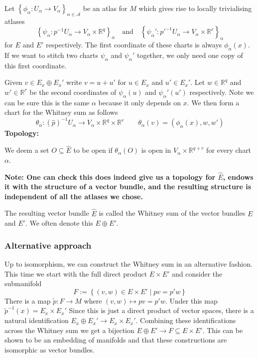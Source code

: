 \documentclass[11pt]{article}
\newcommand{\defeq}{:=}
\newcommand{\relmiddle}[1]{\mathrel{}\middle#1\mathrel{}}
\newcommand{\rmv}{\relmiddle|}
\newcommand{\R}{\mathbb{R}}
\newenvironment{defin}
	{\begin{mdframed}[backgroundcolor=white, roundcorner=5pt, linewidth=1pt, linecolor=RoyalBlue]
		\setlength{\parindent}{0pt}}
	{\end{mdframed}}
\newcommand{\mdf}[1]{{\color{RoyalBlue} #1}}
\newenvironment{note}
	{\begin{mdframed}[backgroundcolor=white, linecolor=RubineRed, roundcorner=5pt, linewidth=1pt]\bfseries{Note:}\normalfont
	\setlength{\parindent}{0pt}}
	{\end{mdframed}}
\begin{document}
Let $\left\{ \phi_\alpha: U_\alpha \to V_\alpha\right\}_{\alpha\in\mathcal{A}}$ be an atlas for $M$ which gives rise to locally trivialising atlases\[
	\left\{ \psi_\alpha : p^{-1}U_\alpha \to V_\alpha \times \R^q\right\}_\alpha \quad \text{and} \quad \left\{ \psi_\alpha':p'^{-1}U_\alpha \to V_\alpha \times \R^r\right\}_\alpha
\]
for $E$ and $E'$ respectively.
The first coordinate of these charts is always $\phi_\alpha(x)$.
If we want to stitch two charts $\psi_\alpha$ and $\psi_\alpha'$ together, we only need one copy of this first coordinate.

Given $v\in E_x \oplus E_x'$ write $v=u+u'$ for $u\in E_x$ and $u'\in E_x'$.
Let $w\in \R^q$ and $w'\in\R^r$ be the second coordinates of $\psi_\alpha(u)$ and $\psi_\alpha'(u')$ respectively.
Note we can be sure this is the same $\alpha$ because it only depends on $x$.
We then form a chart for the Whitney sum as follows
\[
	\theta_\alpha:(\hat{p})^{-1}U_\alpha \to V_\alpha \times \R^q \times \R^r \quad \quad \theta_\alpha(v)=(\phi_\alpha(x), w, w')
\]
\noindent\textbf{Topology: }

We deem a set $O\subseteq\hat{E}$ to be open if $\theta_\alpha(O)$ is open in $V_\alpha\times\R^{q+r}$ for every chart $\alpha$.

\begin{note}
	One can check this does indeed give us a topology for $\hat{E}$, endows it with the structure of a vector bundle, and the resulting structure is independent of all the atlases we chose.
\end{note}

\begin{defin}
	The resulting vector bundle $\hat{E}$ is called the \mdf{Whitney sum} of the vector bundles $E$ and $E'$.	
	We often denote this $E\oplus E'$.
\end{defin}

\subsubsection{Alternative approach}
Up to isomorphism, we can construct the Whitney sum in an alternative fashion.
This time we start with the full direct product $E\times E'$ and consider the submanifold
\[
	F \defeq \left\{ (v, w) \in E\times E' \rmv pv = p'w\right\}
\]
There is a map $\widetilde{p}:F\to M$ where $(v,w)\mapsto pv=p'w$.
Under this map $\widetilde{p}^{-1}(x) = E_x \times E_x'$
Since this is just a direct product of vector spaces, there is a natural identification $E_x\oplus E_x' \to E_x \times E_x'$.
Combining these identifications across the Whitney sum we get a bijection $E\oplus E'\to F \subseteq E\times E'$.
This can be shown to be an embedding of manifolds and that these constructions are isomorphic as vector bundles.
\end{document}
